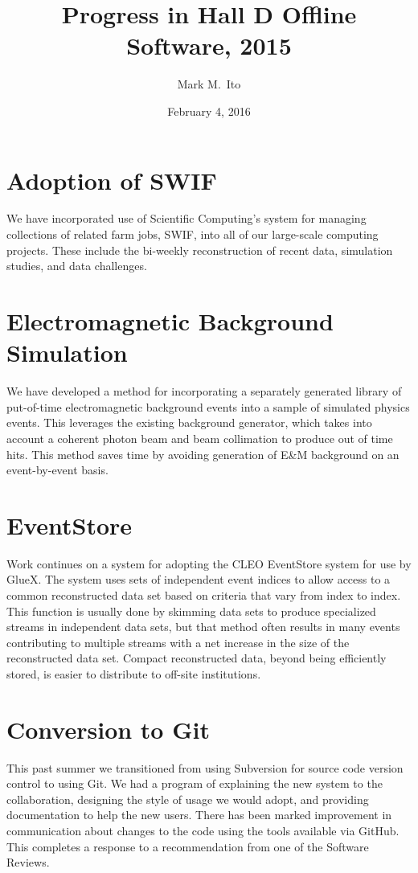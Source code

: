 \documentclass[12pt]{article}
\title{Progress in Hall D Offline Software, 2015}
\author{Mark M.\ Ito}
\date{February 4, 2016}
\begin{document}
\maketitle

\section{Adoption of SWIF}

We have incorporated use of Scientific Computing's system for managing
collections of related farm jobs, SWIF, into all of our large-scale
computing projects. These include the bi-weekly reconstruction of
recent data, simulation studies, and data challenges.

\section{Electromagnetic Background Simulation}

We have developed a method for incorporating a separately generated
library of put-of-time electromagnetic background events into a sample
of simulated physics events. This leverages the existing background
generator, which takes into account a coherent photon beam and beam
collimation to produce out of time hits. This method saves time by
avoiding generation of E\&M background on an event-by-event basis.

\section{EventStore}

Work continues on a system for adopting the CLEO EventStore system for
use by GlueX. The system uses sets of independent event indices to
allow access to a common reconstructed data set based on criteria that
vary from index to index. This function is usually done by skimming
data sets to produce specialized streams in independent data sets, but
that method often results in many events contributing to multiple
streams with a net increase in the size of the reconstructed data
set. Compact reconstructed data, beyond being efficiently stored, is
easier to distribute to off-site institutions.

\section{Conversion to Git}

This past summer we transitioned from using Subversion for source code
version control to using Git. We had a program of explaining the new
system to the collaboration, designing the style of usage we would
adopt, and providing documentation to help the new users. There has
been marked improvement in communication about changes to the code
using the tools available via GitHub. This completes a response to a
recommendation from one of the Software Reviews.
\end{document}
